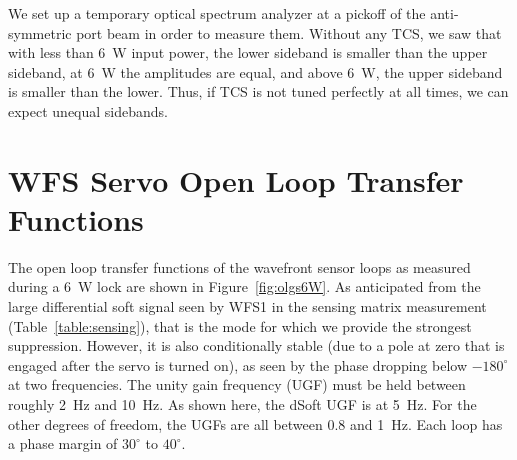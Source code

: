 We set up a temporary optical spectrum analyzer at a pickoff of the
anti-symmetric port beam in order to measure them. Without any TCS, we
saw that with less than 6~W input power, the lower sideband is smaller
than the upper sideband, at 6~W the amplitudes are equal, and above
6~W, the upper sideband is smaller than the lower. Thus, if TCS is not
tuned perfectly at all times, we can expect unequal sidebands.










\section{WFS Servo Open Loop Transfer Functions}
\label{sec:WFSolgs}
The open loop transfer functions of the wavefront sensor loops as
measured during a 6~W lock are shown in Figure~\ref{fig:olgs6W}. As
anticipated from the large differential soft signal seen by WFS1 in
the sensing matrix measurement (Table~\ref{table:sensing}), that is
the mode for which we provide the strongest suppression. However, it
is also conditionally stable (due to a pole at zero that is engaged
after the servo is turned on), as seen by the phase dropping below
$-180^{\circ}$ at two frequencies. The unity gain frequency (UGF) must be
held between roughly 2~Hz and 10~Hz. As shown here, the dSoft UGF is
at 5~Hz. For the other degrees of freedom, the UGFs are all between
0.8 and 1~Hz. Each loop has a phase margin of $30^{\circ}$ to
$40^{\circ}$.

